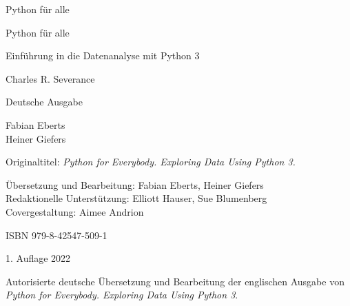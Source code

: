 \begin{titlepage}
\begin{center}
\vspace*{15mm}

\sffamily
\LARGE
Python für alle

\end{center}
\end{titlepage}

\cleardoublepage
\thispagestyle{plain}

\begin{center}
\vspace*{15mm}

\sffamily
\LARGE
Python für alle

\Large
Einführung in die Datenanalyse mit Python 3

\vspace{15mm}

\Large
Charles R. Severance

\vspace{10mm}

\normalsize
Deutsche Ausgabe

\vspace{2mm}

\large
Fabian Eberts\\
Heiner Giefers

\vspace{105mm}

\normalsize

\end{center}

\normalsize
\normalfont


\clearpage
\thispagestyle{plain}

Originaltitel: \textit{Python for Everybody. Exploring Data Using Python 3.}
\bigskip

Übersetzung und Bearbeitung: Fabian Eberts, Heiner Giefers\\
Redaktionelle Unterstützung: Elliott Hauser, Sue Blumenberg\\
Covergestaltung: Aimee Andrion
\bigskip

ISBN 979-8-42547-509-1
\bigskip

1. Auflage 2022

Autorisierte deutsche Übersetzung und Bearbeitung der englischen Ausgabe von \textit{Python for Everybody. Exploring Data Using Python 3}.
\bigskip

